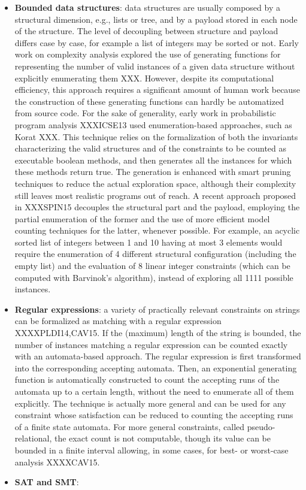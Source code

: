 \begin{itemize}
	\item \textbf{Bounded data structures}: data structures are usually composed by a structural dimension, e.g., lists or tree, and by a payload stored in each node of the structure. The level of decoupling between structure and payload differs case by case, for example a list of integers may be sorted or not. Early work on complexity analysis explored the use of generating functions for representing the number of valid instances of a given data structure without explicitly enumerating them XXX. However, despite its computational efficiency, this approach requires a significant amount of human work because the construction of these generating functions can hardly be automatized from source code. For the sake of generality, early work in probabilistic program analysis XXXICSE13 used enumeration-based approaches, such as Korat XXX. This technique relies on the formalization of both the invariants characterizing the valid structures and of the constraints to be counted as executable boolean methods, and then generates all the instances for which these methods return true. The generation is enhanced with smart pruning techniques to reduce the actual exploration space, although their complexity still leaves most realistic programs out of reach. A recent approach proposed in XXXSPIN15 decouples the structural part and the payload, employing the partial enumeration of the former and the use of more efficient model counting techniques for the latter, whenever possible. For example, an acyclic sorted list of integers between 1 and 10 having at most 3 elements would require the enumeration of 4 different structural configuration (including the empty list) and the evaluation of 8 linear integer constraints (which can be computed with Barvinok's algorithm), instead of exploring all 1111 possible instances.

	\item \textbf{Regular expressions}: a variety of practically relevant constraints on strings can be formalized as matching with a regular expression XXXXPLDI14,CAV15. If the (maximum) length of the string is bounded, the number of instances matching a regular expression can be counted exactly with an automata-based approach. The regular expression is first transformed into the corresponding accepting automata. Then, an exponential generating function is automatically constructed to count the accepting runs of the automata up to a certain length, without the need to enumerate all of them explicitly. The technique is actually more general and can be used for any constraint whose satisfaction can be reduced to counting the accepting runs of a finite state automata. For more general constraints, called pseudo-relational, the exact count is not computable, though its value can be bounded in a finite interval allowing, in some cases, for best- or worst-case analysis XXXXCAV15.
	
	\item \textbf{SAT and SMT}: 

\end{itemize}


